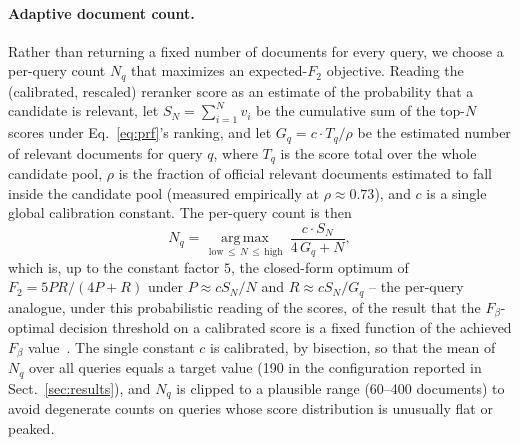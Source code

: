 \documentclass[runningheads]{llncs}
\begin{document}
\paragraph{Adaptive document count.}
Rather than returning a fixed number of documents for every query, we choose
a per-query count $N_q$ that maximizes an expected-$F_2$ objective. Reading
the (calibrated, rescaled) reranker score as an estimate of the probability
that a candidate is relevant, let $S_N = \sum_{i=1}^{N} v_i$ be the
cumulative sum of the top-$N$ scores under Eq.~\eqref{eq:prf}'s ranking, and
let $G_q = c \cdot T_q / \rho$ be the estimated number of relevant documents
for query $q$, where $T_q$ is the score total over the whole candidate pool,
$\rho$ is the fraction of official relevant documents estimated to fall
inside the candidate pool (measured empirically at $\rho \approx 0.73$), and
$c$ is a single global calibration constant. The per-query count is then
\begin{equation}
N_q = \operatorname*{arg\,max}_{\,\mathrm{low} \,\leq\, N \,\leq\, \mathrm{high}} \ \frac{c \cdot S_N}{4\, G_q + N},
\label{eq:f2}
\end{equation}
which is, up to the constant factor $5$, the closed-form optimum of
$F_2 = 5PR/(4P+R)$ under $P \approx c S_N / N$ and $R \approx c S_N / G_q$ --
the per-query analogue, under this probabilistic reading of the scores, of
the result that the $F_\beta$-optimal decision threshold on a calibrated
score is a fixed function of the achieved $F_\beta$
value~\cite{lipton2014thresholding}. The single constant $c$ is calibrated,
by bisection, so that the mean of $N_q$ over all queries equals a target value
(190 in the configuration reported in Sect.~\ref{sec:results}), and $N_q$ is
clipped to a plausible range (60--400 documents) to avoid degenerate counts
on queries whose score distribution is unusually flat or peaked.
\end{document}
